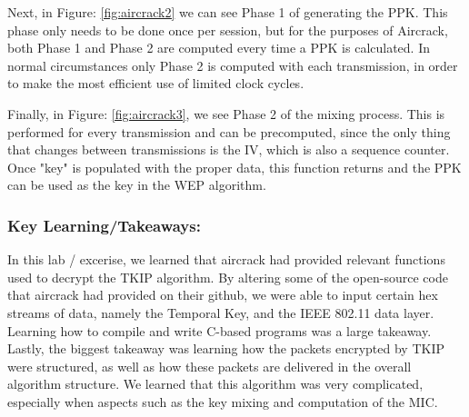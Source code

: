 \documentclass[main.tex]{subfiles}
\begin{document}
Next, in Figure: \ref{fig:aircrack2} we can see Phase 1 of generating the PPK. This phase only needs to be done once per session, but for the purposes of Aircrack, both Phase 1 and Phase 2 are computed every time a PPK is calculated. In normal circumstances only Phase 2 is computed with each transmission, in order to make the most efficient use of limited clock cycles.


Finally, in Figure: \ref{fig:aircrack3}, we see Phase 2 of the mixing process. This is performed for every transmission and can be precomputed, since the only thing that changes between transmissions is the IV, which is also a sequence counter. Once "key" is populated with the proper data, this function returns and the PPK can be used as the key in the WEP algorithm.

\subsubsection{Key Learning/Takeaways:}
\hfill \break
\noindent In this lab / excerise, we learned that aircrack had provided relevant functions used to decrypt the TKIP algorithm. By altering some of the open-source code that aircrack had provided on their github, we were able to input certain hex streams of data, namely the Temporal Key, and the IEEE 802.11 data layer. Learning how to compile and write C-based programs was a large takeaway. Lastly, the biggest takeaway was learning how the packets encrypted by TKIP were structured, as well as how these packets are delivered in the overall algorithm structure. We learned that this algorithm was very complicated, especially when aspects such as the key mixing and computation of the MIC.
\end{document}
